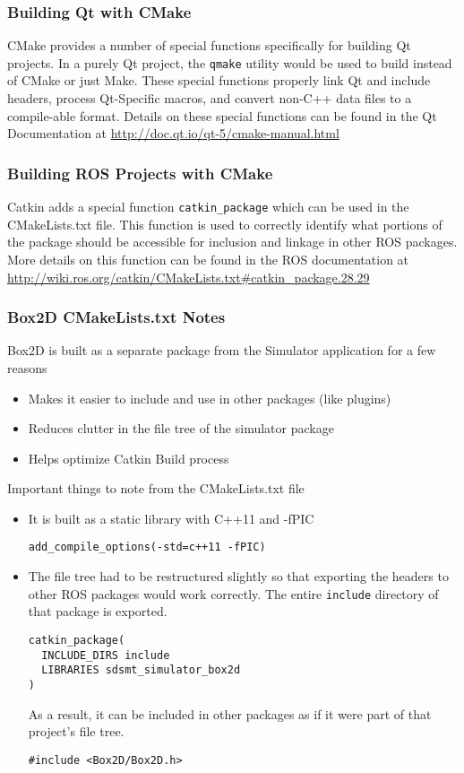 \subsubsection*{Building Qt with CMake}
CMake provides a number of special functions specifically for building Qt projects. In a purely Qt project, the \lstinline|qmake| utility would be used to build instead of CMake or just Make. These special functions properly link Qt and include headers, process Qt-Specific macros, and convert non-C++ data files to a compile-able format. Details on these special functions can be found in the Qt Documentation at \url{http://doc.qt.io/qt-5/cmake-manual.html}

\subsubsection*{Building ROS Projects with CMake}
Catkin adds a special function \lstinline|catkin_package| which can be used in the CMakeLists.txt file. This function is used to correctly identify what portions of the package should be accessible for inclusion and linkage in other ROS packages. More details on this function can be found in the ROS documentation at \url{http://wiki.ros.org/catkin/CMakeLists.txt#catkin_package.28.29}
\subsubsection*{Box2D CMakeLists.txt Notes}
Box2D is built as a separate package from the Simulator application for a few reasons
\begin{itemize}
	\item Makes it easier to include and use in other packages (like plugins)
	\item Reduces clutter in the file tree of the simulator package
	\item Helps optimize Catkin Build process
\end{itemize}

Important things to note from the CMakeLists.txt file
\begin{itemize}
	\item It is built as a static library with C++11 and -fPIC
	\begin{lstlisting}
add_compile_options(-std=c++11 -fPIC)
	\end{lstlisting}
	\item The file tree had to be restructured slightly so that exporting the headers to other ROS packages would work correctly. The entire \lstinline|include| directory of that package is exported.

	\begin{lstlisting}
catkin_package(
  INCLUDE_DIRS include
  LIBRARIES sdsmt_simulator_box2d
)
	\end{lstlisting}
	As a result, it can be included in other packages as if it were part of that project's file tree.
	\begin{lstlisting}
#include <Box2D/Box2D.h>
	\end{lstlisting}
\end{itemize}

